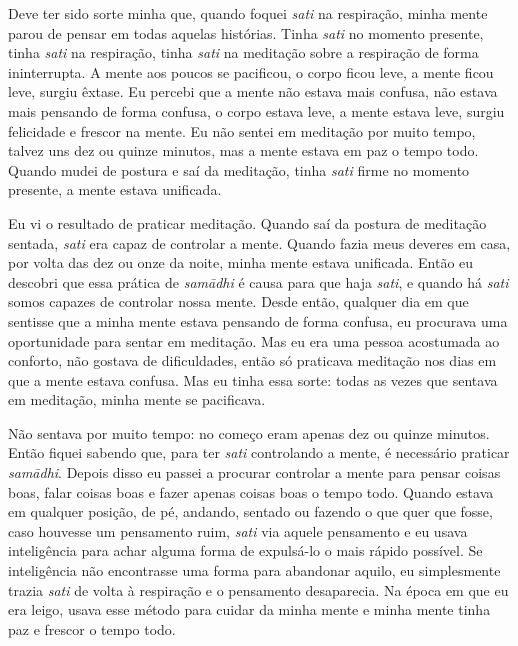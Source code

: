 Deve ter sido sorte minha que, quando foquei \textit{sati} na
respiração, minha mente parou de pensar em todas aquelas histórias.
Tinha \textit{sati} no momento presente, tinha \textit{sati} na
respiração, tinha \textit{sati} na meditação sobre a respiração de
forma ininterrupta. A mente aos poucos se pacificou, o corpo ficou
leve, a mente ficou leve, surgiu êxtase. Eu percebi que a mente não
estava mais confusa, não estava mais pensando de forma confusa, o corpo
estava leve, a mente estava leve, surgiu felicidade e frescor na mente.
Eu não sentei em meditação por muito tempo, talvez uns dez ou quinze
minutos, mas a mente estava em paz o tempo todo. Quando mudei de
postura e saí da meditação, tinha \textit{sati} firme no momento
presente, a mente estava unificada.

Eu vi o resultado de praticar meditação. Quando saí da postura de
meditação sentada, \textit{sati} era capaz de controlar a mente. Quando
fazia meus deveres em casa, por volta das dez ou onze da noite, minha
mente estava unificada. Então eu descobri que essa prática de
\textit{samādhi} é causa para que haja \textit{sati}, e quando há
\textit{sati} somos capazes de controlar nossa mente. Desde então,
qualquer dia em que sentisse que a minha mente estava pensando de forma
confusa, eu procurava uma oportunidade para sentar em meditação. Mas eu
era uma pessoa acostumada ao conforto, não gostava de dificuldades,
então só praticava meditação nos dias em que a mente estava confusa.
Mas eu tinha essa sorte: todas as vezes que sentava em meditação, minha
mente se pacificava.

Não sentava por muito tempo: no começo eram apenas dez ou quinze
minutos. Então fiquei sabendo que, para ter \textit{sati} controlando a
mente, é necessário praticar \textit{samādhi}. Depois disso eu passei
a procurar controlar a mente para pensar coisas boas, falar coisas boas
e fazer apenas coisas boas o tempo todo. Quando estava em qualquer
posição, de pé, andando, sentado ou fazendo o que quer que fosse, caso
houvesse um pensamento ruim, \textit{sati} via aquele pensamento e eu
usava inteligência para achar alguma forma de expulsá-lo o mais rápido
possível. Se inteligência não encontrasse uma forma para abandonar
aquilo, eu simplesmente trazia \textit{sati} de volta à respiração e o
pensamento desaparecia. Na época em que eu era leigo, usava esse método
para cuidar da minha mente e minha mente tinha paz e frescor o tempo
todo.

